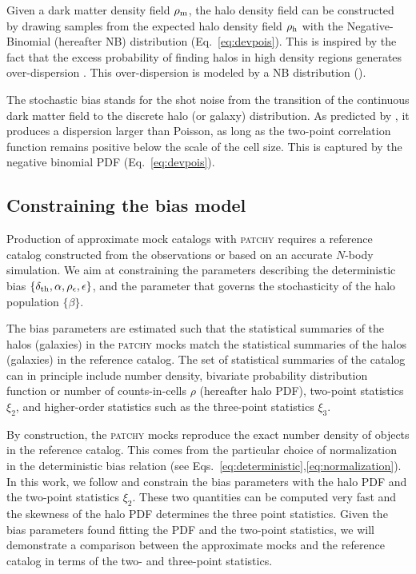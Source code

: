 \documentclass[english,usenatbib]{mn2e}
\begin{document}
Given a dark matter density field $\rho_{\rm m}$, the halo density field can be constructed by drawing samples from the expected halo density field $\rho_{\rm h}$ with the Negative-Binomial (hereafter NB) distribution (Eq.~\ref{eq:devpois}). This is inspired by the fact that the excess probability of finding halos in high density regions generates over-dispersion \citep[][]{somerville2001,miranda2002}. This over-dispersion is modeled by a NB distribution (\citealt{kitaura2014,neyrinck2014}). 

The stochastic bias stands for the shot noise from the transition of the continuous dark matter field to the discrete halo (or galaxy) distribution. As predicted by \citet{Peebles1980}, it produces a dispersion larger than Poisson, as long as the two-point correlation function remains positive below the scale of the cell size. This is captured by the negative binomial PDF (Eq.~\ref{eq:devpois}).

\subsection{Constraining the bias model}
\label{sec:mcmc}

Production of approximate mock catalogs with \textsc{patchy} requires a reference catalog constructed from the observations or based on an accurate $N$-body simulation. 
We aim at constraining the parameters describing the deterministic bias $\{\delta_{\rm th},\alpha, \rho_{\epsilon},\epsilon\}$, and the parameter that governs the stochasticity of the halo population $\{\beta\}$.

The bias parameters are estimated such that the statistical summaries of the halos (galaxies) in the \textsc{patchy} mocks match the statistical summaries of the halos (galaxies) in the reference catalog. The set of statistical summaries of the catalog can in principle include number density, bivariate probability distribution function or number of counts-in-cells $\rho$ (hereafter halo PDF), two-point statistics $\xi_{2}$, and higher-order statistics such as the three-point statistics $\xi_{3}$. 

By construction, the \textsc{patchy} mocks reproduce the exact number density of objects in the reference catalog. This comes from the particular choice of normalization in the deterministic bias relation (see Eqs.~\ref{eq:deterministic},\ref{eq:normalization}). In this work, we follow \citet{kitaura2015} and constrain the bias parameters with the halo PDF and the two-point statistics $\xi_{2}$. These two quantities can be computed very fast and the skewness of the halo PDF determines the three point statistics. Given the bias parameters found fitting the PDF and the two-point statistics, we will demonstrate a comparison between the approximate mocks and the reference catalog in terms of the two- and three-point statistics. 
\end{document}
